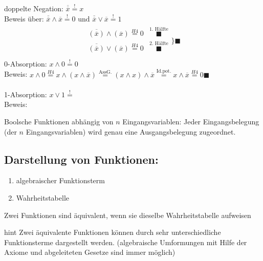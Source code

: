 \documentclass[10pt,a4paper]{scrartcl}
\begin{document}
\noindent
doppelte Negation: $ \overline{\overline{x}} \overset{!}{=} x $\\
Beweis über: $ \overline{\overline{x}} \wedge \overline{x} \overset{!}{=} 0 \text{ und }  \overline{\overline{x}} \vee \overline{x} \overset{!}{=} 1 $\\
\begin{align*}
\begin{array}{cc}
\overline{(\overline{x})} \wedge (\overline{x}) \overset{H4}{=} 0 & \overset{\text{1. Hälfte}}{\blacksquare}\\
\overline{(\overline{x})} \vee (\overline{x}) \overset{H4}{=} 0 & \overset{\text{2. Hälfte}}{\blacksquare}\\
\end{array}
\Bigg\} \blacksquare
\end{align*}
0-Absorption: $ x \wedge 0 \overset{!}{=} 0$\\
Beweis: $ x \wedge 0 \overset{H4}{=} x \wedge (x \wedge \overline{x})  \overset{\text{AssG.}}{=} (x \wedge x) \wedge \overline{x} \overset{\text{Id.pot.}}{=} x \wedge \overline{x} \overset{H4}{=} 0 \blacksquare$\\
\\
1-Absorption: $ x \vee 1 \overset{!}{=} $\\
Beweis: \\
\begin{Theorem}{}{}
Boolsche Funktionen abhängig von $ n $ Eingangsvariablen: Jeder Eingangsbelegung (der $ n $ Eingangsvariablen) wird genau eine Ausgangsbelegung zugeordnet.
\end{Theorem}

\subsection{Darstellung von Funktionen:}
\begin{enumerate}
	\item algebraischer Funktionsterm
	\item Wahrheitstabelle
\end{enumerate}

\begin{Theorem}{}{}
	Zwei Funktionen sind äquivalent, wenn sie dieselbe Wahrheitstabelle aufweisen
\end{Theorem}

\begin{Hint}{}{hint}
	Zwei äquivalente Funktionen können durch sehr unterschiedliche Funktionsterme dargestellt werden. (algebraische Umformungen mit Hilfe der Axiome und abgeleiteten Gesetze sind immer möglich)
\end{Hint}
\end{document}
